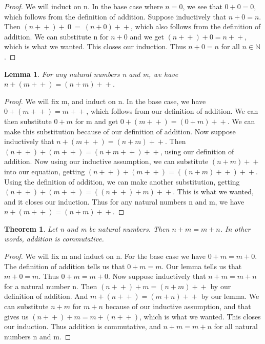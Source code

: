 \documentclass{article}
\newtheorem{lemma}{Lemma}
\newtheorem{theorem}{Theorem}
\newcommand{\inc}[1]{#1\!+\!+}
\newcommand{\incp}[1]{(#1\!+\!+)}
\begin{document}
\begin{proof}
We will induct on n. In the base case where $n = 0$, we see that $0 + 0 = 0$, which follows from the definition of addition. Suppose inductively that $n + 0 = n$. Then $(\inc{n}) + \ 0 \ = \ \inc{(n+0)}$, which also follows from the definition of addition. We can substitute n for $n + 0$ and we get $(\inc{n}) + 0 = \inc{n}$, which is what we wanted. This closes our induction. Thus $n + 0 = n$ for all $n \in \mathbb{N}$.
\end{proof}

\begin{lemma}
For any natural numbers n and m, we have $n + (\inc{m}) = \inc{(n+m)}$.
\end{lemma}

\begin{proof}
We will fix m, and induct on n. In the base case, we have $0 + (\inc{m}) = \inc{m}$, which follows from our definition of addition. We can then substitute $0 + m$ for m and get $0 + (\inc{m}) = \inc{(0+m)}$. We can make this substitution because of our definition of addition. Now suppose inductively that $n + (\inc{m}) = \inc{(n+m)}$. Then $(\inc{n}) + (\inc{m}) = \inc{(n + \inc{m})}$, using our definition of addition. Now using our inductive assumption, we can substitute $\inc{(n+m)}$ into our equation, getting $(\inc{n}) + (\inc{m}) = \inc{( \inc{(n+m)})}$. Using the definition of addition, we can make another substitution, getting $(\inc{n}) + (\inc{m}) = \inc{((\inc{n}) + m)}$. This is what we wanted, and it closes our induction. Thus for any natural numbers n and m, we have $n + (\inc{m}) = \inc{(n+m)}$.
\end{proof}

\begin{theorem}
Let n and m be natural numbers. Then $n + m = m + n$. In other words, addition is commutative.
\end{theorem}

\begin{proof}
We will fix m and induct on n. For the base case we have $0 + m = m + 0$. The definition of addition tells us that $0 + m = m$. Our lemma tells us that $m + 0 = m$. Thus $0 + m = m + 0$. Now suppose inductively that $n + m = m + n$ for a natural number n. Then $\incp{n} + m = \inc{(n+m)}$ by our definition of addition. And $m + \incp{n} = \inc{(m + n)}$ by our lemma. We can substitute $n + m$ for $m + n$ because of our inductive assumption, and that gives us $\incp{n} + m = m + \incp{n}$, which is what we wanted. This closes our induction. Thus addition is commutative, and $n + m = m + n$ for all natural numbers n and m.
\end{proof}
\end{document}
